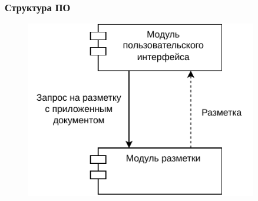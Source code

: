 \documentclass[gray]{beamer}
\begin{document}
\begin{frame}
    \frametitle{Структура ПО}
    \begin{figure}[H]
        \centering
        \hspace{-1.5cm}\includegraphics[width=0.9\textwidth]{diag/components.pdf}
    \end{figure}
\end{frame}
\end{document}
